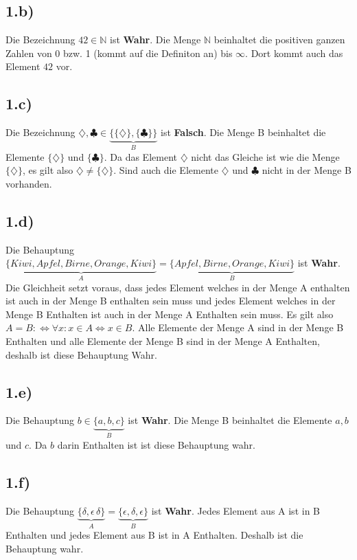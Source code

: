 \documentclass[10pt,ngerman]{scrartcl}
\begin{document}
\subsection{1.b)}
Die Bezeichnung $42 \in \mathbb{N}$ ist \textbf{Wahr}. Die Menge $\mathbb{N}$ beinhaltet die positiven ganzen Zahlen von 0 bzw. 1 (kommt auf die Definiton an) bis $\infty$. Dort kommt auch das Element $42$ vor.

\subsection{1.c)}
Die Bezeichnung $\diamondsuit,\clubsuit \in \underbrace{\{\{\diamondsuit\},\{\clubsuit\}\}}_{B}$ ist \textbf{Falsch}. Die Menge B beinhaltet die Elemente $\{\diamondsuit\}$ und $\{\clubsuit\}$. Da das Element $\diamondsuit$ nicht das Gleiche ist wie die Menge $\{\diamondsuit\}$, es gilt also $\diamondsuit \neq \{\diamondsuit\}$. Sind auch die Elemente $\diamondsuit$ und $\clubsuit$ nicht in der Menge B vorhanden.

\subsection{1.d)}
Die Behauptung $\underbrace{\{Kiwi,Apfel,Birne,Orange,Kiwi\}}_{A} = \underbrace{\{Apfel,Birne,Orange,Kiwi\}}_{B}$ ist \textbf{Wahr}. Die Gleichheit setzt voraus, dass jedes Element welches in der Menge A enthalten ist auch in der Menge B enthalten sein muss und jedes Element welches in der Menge B Enthalten ist auch in der Menge A Enthalten sein muss. Es gilt also $A=B: \Leftrightarrow \forall x: x \in A \Leftrightarrow x\in B$. Alle Elemente der Menge A sind in der Menge B Enthalten und alle Elemente der Menge B sind in der Menge A Enthalten, deshalb ist diese Behauptung Wahr.

\subsection{1.e)}
Die Behauptung $b \in \underbrace{\{a,b,c\}}_{B}$ ist \textbf{Wahr}. Die Menge B beinhaltet die Elemente $a,b$ und $c$. Da $b$  darin Enthalten ist ist diese Behauptung wahr.

\subsection{1.f)}
Die Behauptung $\underbrace{\{\delta,\epsilon\,\delta\}}_{A} = \underbrace{\{\epsilon,\delta,\epsilon\}}_{B}$ ist \textbf{Wahr}. Jedes Element aus A ist in B Enthalten und jedes Element aus B ist in A Enthalten. Deshalb ist die Behauptung wahr.
\end{document}
